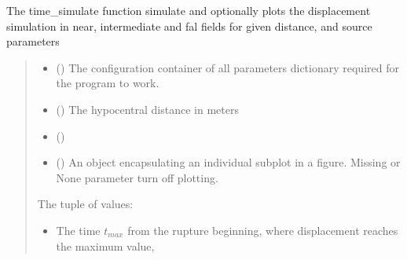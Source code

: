 \documentclass[letterpaper,10pt,english]{sphinxmanual}
\begin{document}

\begin{fulllineitems}
\label{\detokenize{api_run:ssspy.time_simulate}}
\pysigstartsignatures
{}
\pysigstopsignatures
\sphinxAtStartPar
The time\_simulate function simulate and optionally plots the displacement simulation
in near, intermediate and fal fields for given distance, and source parameters
\begin{quote}\begin{description}
\begin{itemize}
\item {} 
\sphinxAtStartPar
{} () \textendash{} The configuration container of all parameters dictionary required for the program to work.

\item {} 
\sphinxAtStartPar
{} () \textendash{} The hypocentral distance in meters

\item {} 
\sphinxAtStartPar
{} ()

\item {} 
\sphinxAtStartPar
{} () \textendash{} An object encapsulating an individual subplot in a figure.
Missing or None parameter turn off plotting.

\end{itemize}

\sphinxAtStartPar

\sphinxAtStartPar
The tuple of values:
\begin{itemize}
\item {} 
\sphinxAtStartPar
The time \(t_{max}\) from the rupture beginning, where displacement reaches the maximum value,


\end{itemize}
\end{description}
\end{quote}
\end{fulllineitems}
\end{document}
